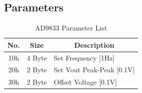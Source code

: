 \subsection{Parameters}
\begin{table}[H]
    \centering
    \begin{tabular}{|c|c|l|}
        \hline
        \textbf{No.}   &   \textbf{Size} & \multicolumn{1}{|c|}{\textbf{Description}}\\ \hline \hline
        10h   &  4 Byte &  Set Frequency [1Hz]\\ \hline
		20h   &  2 Byte &  Set Vout Peak-Peak [0.1V]\\ \hline
		30h	  &  2 Byte &  Offset Voltage [0.1V] \\ \hline
    \end{tabular}
	\caption{AD9833 Parameter List}
\label{tab:Par-Waveform9833}
\end{table}
